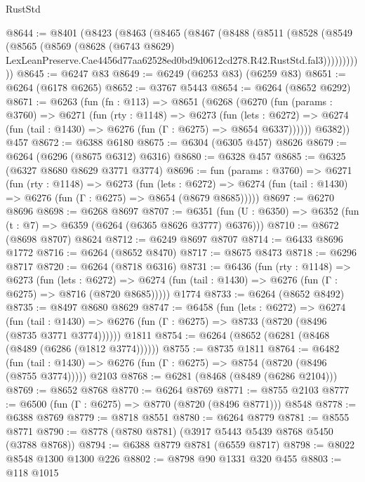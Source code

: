 \begin{lexlean}{RustStd}
\begin{coremodule}
@8644 := @8401
    (@8423
      (@8463
        (@8465
          (@8467
            (@8488
              (@8511
                (@8528
                  (@8549
                    (@8565
                      (@8569
                        (@8628
                          (@6743 @8629)
                          LexLeanPreserve.Cae4456d77aa62528ed0bd9d0612cd278.R42.RustStd.fal3)))))))))))
@8645 := @6247 @83
@8649 := @6249 (@6253 @83) (@6259 @83)
@8651 := @6264 (@6178 @6265)
@8652 := @3767 @5443
@8654 := @6264 (@8652 @6292)
@8671 := @6263
    (fun (fn : @113) =>
    @8651
      (@6268
        (@6270
          (fun (params : @3760) =>
          @6271
            (fun (rty : @1148) =>
            @6273
              (fun (lets : @6272) =>
              @6274 (fun (tail : @1430) => @6276 (fun (Γ : @6275) => @8654 @6337))))))
        @6382))
    @457
@8672 := @6388 @6180
@8675 := @6304 (@6305 @457) @8626
@8679 := @6264 (@6296 (@8675 @6312) @6316)
@8680 := @6328 @457
@8685 := @6325 (@6327 @8680 @8629 @3771 @3774)
@8696 := fun (params : @3760) =>
  @6271
    (fun (rty : @1148) =>
    @6273
      (fun (lets : @6272) =>
      @6274 (fun (tail : @1430) => @6276 (fun (Γ : @6275) => @8654 (@8679 @8685)))))
@8697 := @6270 @8696
@8698 := @6268 @8697
@8707 := @6351 (fun (U : @6350) => @6352 (fun (t : @7) => @6359 (@6264 (@6365 @8626 @3777) @6376)))
@8710 := @8672 (@8698 @8707) @8624
@8712 := @6249 @8697 @8707
@8714 := @6433 @8696 @1772
@8716 := @6264 (@8652 @8470)
@8717 := @8675 @8473
@8718 := @6296 @8717
@8720 := @6264 (@8718 @6316)
@8731 := @6436
    (fun (rty : @1148) =>
    @6273
      (fun (lets : @6272) =>
      @6274 (fun (tail : @1430) => @6276 (fun (Γ : @6275) => @8716 (@8720 @8685)))))
    @1774
@8733 := @6264 (@8652 @8492)
@8735 := @8497 @8680 @8629
@8747 := @6458
    (fun (lets : @6272) =>
    @6274
      (fun (tail : @1430) => @6276 (fun (Γ : @6275) => @8733 (@8720 (@8496 (@8735 @3771 @3774))))))
    @1811
@8754 := @6264 (@8652 (@6281 (@8468 (@8489 (@6286 (@1812 @3774))))))
@8755 := @8735 @1811
@8764 := @6482
    (fun (tail : @1430) => @6276 (fun (Γ : @6275) => @8754 (@8720 (@8496 (@8755 @3774)))))
    @2103
@8768 := @6281 (@8468 (@8489 (@6286 @2104)))
@8769 := @8652 @8768
@8770 := @6264 @8769
@8771 := @8755 @2103
@8777 := @6500 (fun (Γ : @6275) => @8770 (@8720 (@8496 @8771))) @8548
@8778 := @6388 @8769
@8779 := @8718 @8551
@8780 := @6264 @8779
@8781 := @8555 @8771
@8790 := @8778 (@8780 @8781) (@3917 @5443 @5439 @8768 @5450 (@3788 @8768))
@8794 := @6388 @8779 @8781 (@6559 @8717)
@8798 := @8022 @8548 @1300 @1300 @226
@8802 := @8798 @90 @1331 @320 @455
@8803 := @118 @1015

\end{coremodule}
\end{lexlean}
